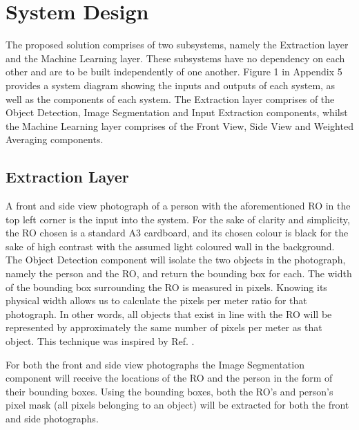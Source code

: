 \documentclass[conference]{IEEEtran}
\begin{document}
\section{System Design}
The proposed solution comprises of two subsystems, namely the Extraction layer and the Machine Learning layer.
These subsystems have no dependency on each other and are to be built independently of one another.
Figure 1 in Appendix 5 provides a system diagram showing the inputs and outputs of each system, as well as the components of each system.
The Extraction layer comprises of the Object Detection, Image Segmentation and Input Extraction components, whilst the Machine Learning layer comprises of the Front View, Side View and Weighted Averaging components.
\subsection{Extraction Layer}
A front and side view photograph of a person with the aforementioned RO in the top left corner is the input into the system.
For the sake of clarity and simplicity, the RO chosen is a standard A3 cardboard, and its chosen colour is black for the sake of high contrast with the assumed light coloured wall in the background.
The Object Detection component will isolate the two objects in the photograph, namely the person and the RO, and return the bounding box for each.
The width of the bounding box surrounding the RO is measured in pixels.
Knowing its physical width allows us to calculate the pixels per meter ratio for that photograph.
In other words, all objects that exist in line with the RO will be represented by approximately the same number of pixels per meter as that object.
This technique was inspired by Ref. \cite{objectDetection}.

For both the front and side view photographs the Image Segmentation component will receive the locations of the RO and the person in the form of their bounding boxes.
Using the bounding boxes, both the RO's and person's pixel mask (all pixels belonging to an object) will be extracted for both the front and side photographs.
\end{document}
